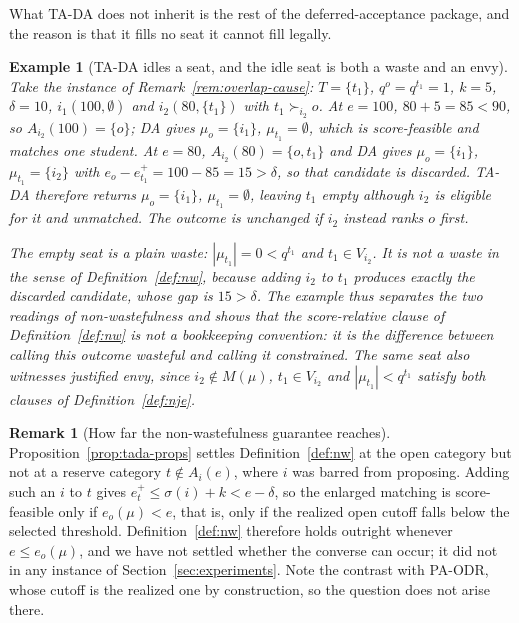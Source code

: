 \documentclass[a4paper,twoside]{article}
\newtheorem{example}{Example}
\theoremstyle{definition}
\newtheorem{nremark}{Remark}
\begin{document}
What TA-DA does not inherit is the rest of the deferred-acceptance package, and the reason is that it fills no seat it cannot fill legally.

\begin{example}[TA-DA idles a seat, and the idle seat is both a waste and an envy]
\label{ex:tada-idle}
Take the instance of Remark~\ref{rem:overlap-cause}: $T=\{t_1\}$, $q^o=q^{t_1}=1$, $k=5$, $\delta=10$, $i_1(100,\emptyset)$ and $i_2(80,\{t_1\})$ with $t_1\succ_{i_2}o$. At $e=100$, $80+5=85<90$, so $A_{i_2}(100)=\{o\}$; DA gives $\mu_o=\{i_1\}$, $\mu_{t_1}=\emptyset$, which is score-feasible and matches one student. At $e=80$, $A_{i_2}(80)=\{o,t_1\}$ and DA gives $\mu_o=\{i_1\}$, $\mu_{t_1}=\{i_2\}$ with $e_o-e_{t_1}^+=100-85=15>\delta$, so that candidate is discarded. TA-DA therefore returns $\mu_o=\{i_1\}$, $\mu_{t_1}=\emptyset$, leaving $t_1$ empty although $i_2$ is eligible for it and unmatched. The outcome is unchanged if $i_2$ instead ranks $o$ first.

The empty seat is a plain waste: $|\mu_{t_1}|=0<q^{t_1}$ and $t_1\in V_{i_2}$. It is not a waste in the sense of Definition~\ref{def:nw}, because adding $i_2$ to $t_1$ produces exactly the discarded candidate, whose gap is $15>\delta$. The example thus separates the two readings of non-wastefulness and shows that the score-relative clause of Definition~\ref{def:nw} is not a bookkeeping convention: it is the difference between calling this outcome wasteful and calling it constrained. The same seat also witnesses justified envy, since $i_2\notin M(\mu)$, $t_1\in V_{i_2}$ and $|\mu_{t_1}|<q^{t_1}$ satisfy both clauses of Definition~\ref{def:nje}.
\end{example}

\begin{nremark}[How far the non-wastefulness guarantee reaches]
\label{rem:tada-nw}
Proposition~\ref{prop:tada-props} settles Definition~\ref{def:nw} at the open category but not at a reserve category $t\notin A_i(e)$, where $i$ was barred from proposing. Adding such an $i$ to $t$ gives $e_t^+\le\sigma(i)+k<e-\delta$, so the enlarged matching is score-feasible only if $e_o(\mu)<e$, that is, only if the realized open cutoff falls below the selected threshold. Definition~\ref{def:nw} therefore holds outright whenever $e\le e_o(\mu)$, and we have not settled whether the converse can occur; it did not in any instance of Section~\ref{sec:experiments}. Note the contrast with PA-ODR, whose cutoff is the realized one by construction, so the question does not arise there.
\end{nremark}
\end{document}
